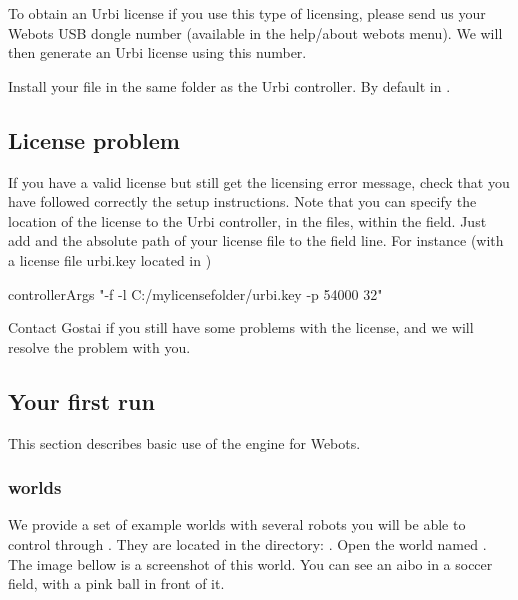 To obtain an Urbi license if you use this type of licensing, please
send us your Webots USB dongle number (available in the help/about
webots menu). We will then generate an Urbi license using this number.

Install your  file in the same folder as the Urbi
controller.  By default in
.

\subsection{License problem}
\label{webots.problem}%

If you have a valid license but still get the licensing error message,
check that you have followed correctly the setup instructions. Note
that you can specify the location of the  license to
the Urbi controller, in the  files, within the
 field. Just add  and the absolute
path of your license file to the field line. For instance (with a
license file urbi.key located in )

\begin{shell}
controllerArgs "-f -l C:/mylicensefolder/urbi.key  -p 54000 32"
\end{shell}

Contact Gostai if you still have some problems with the license, and
we will resolve the problem with you.

\subsection{Your first run}
\label{webots.firstrun}%

This section describes basic use of the \urbi engine for Webots.

\subsubsection{\urbi worlds}
\label{webots.firstrun.openworld}%

We provide a set of example worlds with several robots you will be
able to control through \urbi. They are located in the directory:
.  Open the
world named . The image bellow is a
screenshot of this world. You can see an aibo in a soccer field, with
a pink ball in front of it.


